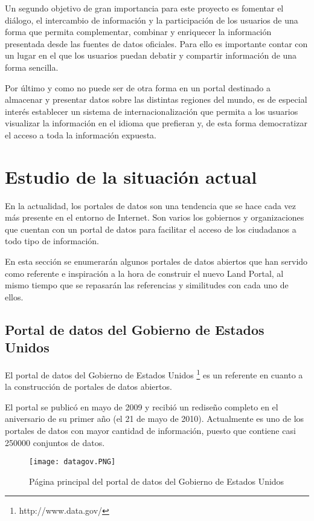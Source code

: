 Un segundo objetivo de gran importancia para este proyecto es fomentar el diálogo, el intercambio de información y la participación de los usuarios de una forma que permita complementar, combinar y enriquecer la información presentada desde las fuentes de datos oficiales. Para ello es importante contar con un lugar en el que los usuarios puedan debatir y compartir información de una forma sencilla.

Por último y como no puede ser de otra forma en un portal destinado a almacenar y presentar datos sobre las distintas regiones del mundo, es de especial interés establecer un sistema de internacionalización que permita a los usuarios visualizar la información en el idioma que prefieran y, de esta forma democratizar el acceso a toda la información expuesta.



\section{Estudio de la situación actual}
En la actualidad, los portales de datos son una tendencia que se hace cada vez más presente en el entorno de Internet.  Son varios los gobiernos y organizaciones que cuentan con un portal de datos para facilitar el acceso de los ciudadanos a todo tipo de información.

En esta sección se enumerarán algunos portales de datos abiertos que han servido como referente e inspiración a la hora de construir el nuevo Land Portal, al mismo tiempo que se repasarán las referencias y similitudes con cada uno de ellos.

\subsection{Portal de datos del Gobierno de Estados Unidos}
El portal de datos del Gobierno de Estados Unidos \footnote{http://www.data.gov/} es un referente en cuanto a la construcción de portales de datos abiertos.

El portal se publicó en mayo de 2009 y recibió un rediseño completo en el aniversario de su primer año (el 21 de mayo de 2010).  Actualmente es uno de los portales de datos con mayor cantidad de información, puesto que contiene casi 250000 conjuntos de datos.
\begin{figure}[h]
\centering
\texttt{[image: datagov.PNG]}
\caption{Página principal del portal de datos del Gobierno de Estados Unidos}
\end{figure}

